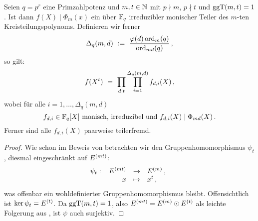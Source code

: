 \begin{satz}
  \label{satz:zerfall_f_x_s}
  Seien $q=p^r$ eine Primzahlpotenz und
  $m,t\in \mathbb{N}$ mit $p\nmid m$, $p\nmid t$ und $\operatorname{ggT}(m,t) = 1$. Ist dann 
  $f(X) \mid \Phi_m(x)$ ein über $\mathbb{F}_q$ irreduzibler monischer Teiler des
  $m$-ten Kreisteilungspolynoms. Definieren wir 
  ferner 
  \[ \Delta_q(m,d) \ :=\  \frac{\varphi(d) \operatorname{ord}_m(q)}{\operatorname{ord}_{md}(q)}\,,\]
  so gilt:
  \[ f(X^t) \ =\  \prod_{d\mid t} \prod_{i=1}^{\Delta_q(m,d)} f_{d,i}(X)\,,\]
  wobei für alle $i=1,\ldots,\Delta_q(m,d)$ 
  \[ f_{d,i}\in \mathbb{F}_q[X] 
    \text{ monisch, irreduzibel und } f_{d,i}(X) \mid \Phi_{md}(X)\,.\]
  Ferner sind alle $f_{d,i}(X)$ paarweise teilerfremd.
\end{satz}
\begin{proof}
  Wie schon im Beweis von
   betrachten wir
  den Gruppenhomomorphismus $\psi_t$, diesmal eingeschränkt auf $E^{(mt)}$:
  \[ \psi_t:\ \funcdef{E\kl{mt} & \to& E\kl m\,,\\
    x &\mapsto& x^t\,,}\]
  was offenbar ein wohldefinierter Gruppenhomomorphismus bleibt.
  Offensichtlich ist $\ker\psi_t = E^{(t)}$. Da $\operatorname{ggT}(m,t) = 1$, also 
  $E^{(mt)} = E^{(m)} \odot E^{(t)}$ als leichte Folgerung aus
  , ist $\psi$ auch surjektiv.


\end{proof}
